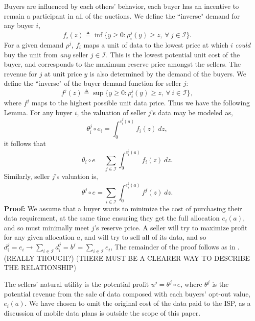 \documentclass[12pt]{article}
\theoremstyle{definition}
\newcommand{\mcI}{\mathcal{I}}
\begin{document}
\begin{multicols}{2}
Buyers are influenced by each others' behavior, each buyer has an incentive to
remain a participant in all of the auctions.
We define the ``inverse" demand for any buyer $i$,
\begin{equation}\label{revenue}
    f_i(z) \triangleq \inf\big\lbrace y\ge 0:
        \rho_i^j(y) \ge z, \ \forall \ j \in \mcI\big\rbrace.
\end{equation}
For a given demand $\rho^j$, $f_i$ maps a unit of data to the lowest price at
which $i$ \emph{could} buy the unit from \emph{any} seller $j\in\mcI$. This is the
lowest potential unit cost of the buyer, and corresponds to the maximum reserve
price amongst the sellers. 
The revenue for $j$ at unit price $y$ is also determined by the
demand of the buyers.
We define the ``inverse" of the buyer demand function for seller $j$:
\begin{equation}\label{revenue}
    f^j(z) \triangleq \sup\big\lbrace y\ge 0:
        \rho_i^j(y) \ge z, \ \forall \ i \in \mcI\big\rbrace,
\end{equation}
where $f^j$ maps to the highest possible unit data price.
Thus we have the following Lemma. 
{
\label{uservaluation}
For any buyer $i$, the valuation of seller $j$'s data may be modeled as,
\begin{equation}\label{buyerprice}
    \theta_i^j \circ e_i = \int_0^{e_i^j(a)} f_i(z) \ dz,
\end{equation}
it follows that 
\begin{equation}\label{valuation}
    \theta_i \circ e = \displaystyle\sum_{j\in\mcI}
 \int_0^{e_i^j(a)} f_i(z) \ dz.
\end{equation}
Similarly, seller $j$'s valuation is,
\begin{equation}\label{sellervaluation}
    \theta^j \circ e = \displaystyle\sum_{i\in\mcI}
 \int_0^{e_i^j(a)} f^j(z) \ dz.
\end{equation}
}
\textbf{Proof:} 
We assume that a buyer wants to minimize the cost of purchasing their data
requirement, at the same time ensuring they get the full allocation $e_i(a)$,
and so must minimally meet $j$'s reserve price.
A seller will try to maximize profit for any given allocation $a$,
and will try to sell all of its data, and so 
$d_i^j = e_i \rightarrow \sum_{i\in{\mcI}} d_i^j = b^j =
\sum_{i\in\mcI} e_i$,
The remainder of the proof follows as in \cite{semret}. (REALLY THOUGH?)
(THERE MUST BE A CLEARER WAY TO DESCRIBE THE RELATIONSHIP)

The sellers' natural utility is the potential
profit $u^j = \theta^j\circ e$, where $\theta^j$ is the
potential revenue from the sale of data composed with each buyers' opt-out value, $e_i(a)$. 
We have chosen to omit the original cost of the data
paid to the ISP, as a discussion of mobile data plans is outside the scope of this
paper.  


\end{multicols}
\end{document}
